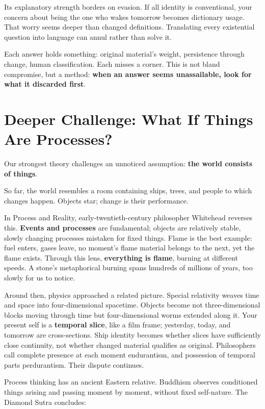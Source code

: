 Its explanatory strength borders on evasion. If all identity is conventional, your concern about being the one who wakes tomorrow becomes dictionary usage. That worry seems deeper than changed definitions. Translating every existential question into language can annul rather than solve it.

Each answer holds something: original material's weight, persistence through change, human classification. Each misses a corner. This is not bland compromise, but a method: \textbf{when an answer seems unassailable, look for what it discarded first}.

\section[What If Things Are Processes?]{Deeper Challenge: What If Things Are Processes?}
Our strongest theory challenges an unnoticed assumption: \textbf{the world consists of things}.

So far, the world resembles a room containing ships, trees, and people to which changes happen. Objects star; change is their performance.

In Process and Reality, early-twentieth-century philosopher Whitehead reverses this. \textbf{Events and processes} are fundamental; objects are relatively stable, slowly changing processes mistaken for fixed things. Flame is the best example: fuel enters, gases leave, no moment's flame material belongs to the next, yet the flame exists. Through this lens, \textbf{everything is flame}, burning at different speeds. A stone's metaphorical burning spans hundreds of millions of years, too slowly for us to notice.

Around then, physics approached a related picture. Special relativity weaves time and space into four-dimensional spacetime. Objects become not three-dimensional blocks moving through time but four-dimensional worms extended along it. Your present self is a \textbf{temporal slice}, like a film frame; yesterday, today, and tomorrow are cross-sections. Ship identity becomes whether slices have sufficiently close continuity, not whether changed material qualifies as original. Philosophers call complete presence at each moment endurantism, and possession of temporal parts perdurantism. Their dispute continues.

Process thinking has an ancient Eastern relative. Buddhism observes conditioned things arising and passing moment by moment, without fixed self-nature. The Diamond Sutra concludes:

